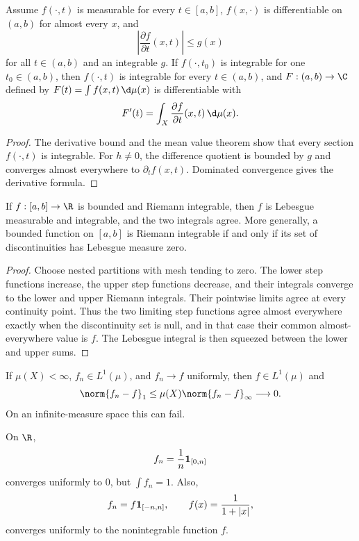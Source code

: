 \begin{thm}
Assume $f(\cdot,t)$ is measurable for every $t\in[a,b]$, $f(x,\cdot)$ is differentiable on $(a,b)$ for almost every $x$, and
\[
\left|\frac{\partial f}{\partial t}(x,t)\right|\leq g(x)
\]
for all $t\in(a,b)$ and an integrable $g$. If $f(\cdot,t_0)$ is integrable for one $t_0\in(a,b)$, then $f(\cdot,t)$ is integrable for every $t\in(a,b)$, and $F:(a,b)\to\C$ defined by $F(t)=\int f(x,t)\,\d\mu(x)$ is differentiable with
\[
F'(t)=\int_X\frac{\partial f}{\partial t}(x,t)\,\d\mu(x).
\]
\end{thm}

\begin{proof}
The derivative bound and the mean value theorem show that every section $f(\cdot,t)$ is integrable. For $h\neq0$, the difference quotient is bounded by $g$ and converges almost everywhere to $\partial_tf(x,t)$. Dominated convergence gives the derivative formula.
\end{proof}

\begin{thm}
If $f:[a,b]\to\R$ is bounded and Riemann integrable, then $f$ is Lebesgue measurable and integrable, and the two integrals agree. More generally, a bounded function on $[a,b]$ is Riemann integrable if and only if its set of discontinuities has Lebesgue measure zero.
\end{thm}

\begin{proof}
Choose nested partitions with mesh tending to zero. The lower step functions increase, the upper step functions decrease, and their integrals converge to the lower and upper Riemann integrals. Their pointwise limits agree at every continuity point. Thus the two limiting step functions agree almost everywhere exactly when the discontinuity set is null, and in that case their common almost-everywhere value is $f$. The Lebesgue integral is then squeezed between the lower and upper sums.
\end{proof}

\begin{prop}
If $\mu(X)<\infty$, $f_n\in L^1(\mu)$, and $f_n\to f$ uniformly, then $f\in L^1(\mu)$ and
\[
\norm{f_n-f}_1\leq\mu(X)\norm{f_n-f}_\infty\longrightarrow0.
\]
On an infinite-measure space this can fail.
\end{prop}

\begin{eg}
On $\R$,
\[
f_n=\frac1n\mathbf{1}_{[0,n]}
\]
converges uniformly to $0$, but $\int f_n=1$. Also,
\[
f_n=f\mathbf{1}_{[-n,n]},
\qquad
f(x)=\frac1{1+|x|},
\]
converges uniformly to the nonintegrable function $f$.
\end{eg}

